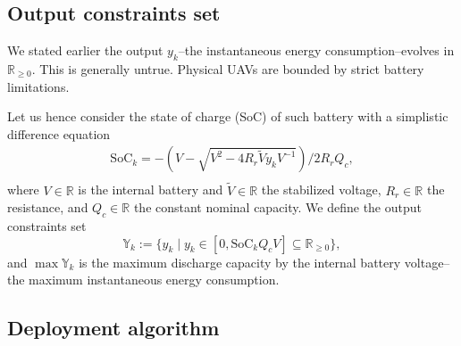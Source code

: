 \documentclass[letterpaper,10pt,conference]{ieeeconf}
\theoremstyle{definition}
\begin{document}
\subsection{Output constraints set}

We stated earlier the output $y_k$--the instantaneous energy consumption--evolves in $\mathbb{R}_{\geq 0}$. This is generally untrue. Physical UAVs are bounded by strict battery limitations.

Let us hence consider the state of charge (SoC) of such battery with a simplistic difference equation~\cite{seewald2020mechanical}
\begin{equation}\begin{split}
  \mathrm{SoC}_k=-\left(V-
  \sqrt{
    V^2-
    4R_r\tilde{V}y_kV^{-1}}
  \right)/2R_rQ_c,\\ 
\end{split}\end{equation}
where $V\in\mathbb{R}$ is the internal battery and $\tilde{V}\in\mathbb{R}$ the stabilized voltage, $R_r\in\mathbb{R}$ the resistance, and $Q_c\in\mathbb{R}$ the constant nominal capacity. We define the output constraints set
\begin{equation}
  \mathbb{Y}_k:=\{y_k\mid y_k\in[0,\mathrm{SoC}_kQ_cV]\subseteq{\mathbb{R}_{\geq 0}}\},
\end{equation}
and $\max{\mathbb{Y}}_k$ is the maximum discharge capacity by the internal battery voltage--the maximum instantaneous energy consumption.
\subsection{Deployment algorithm}
\end{document}

